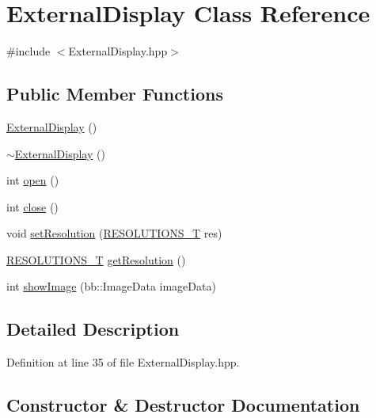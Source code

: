 \hypertarget{class_external_display}{}\section{External\+Display Class Reference}
\label{class_external_display}


{\ttfamily \#include $<$External\+Display.\+hpp$>$}

\subsection*{Public Member Functions}
\begin{DoxyCompactItemize}
\item 
\hyperlink{class_external_display_acb2cebd56141046228bfb6c653fb1e46}{External\+Display} ()
\item 
\hyperlink{class_external_display_a0ef112afc9408ac2a787dd5d8b74127b}{$\sim$\+External\+Display} ()
\item 
int \hyperlink{class_external_display_aaf0cfeaf1464cf09bb931b71b0695cfc}{open} ()
\item 
int \hyperlink{class_external_display_a63bded082f1005f82540741c47fc40ef}{close} ()
\item 
void \hyperlink{class_external_display_af999fd20458b4f474b3c8009af0820ce}{set\+Resolution} (\hyperlink{_external_display_8hpp_aec53cff8866c55706875f08a5cb6aa6a}{R\+E\+S\+O\+L\+U\+T\+I\+O\+N\+S\+\_\+\+T} res)
\item 
\hyperlink{_external_display_8hpp_aec53cff8866c55706875f08a5cb6aa6a}{R\+E\+S\+O\+L\+U\+T\+I\+O\+N\+S\+\_\+\+T} \hyperlink{class_external_display_ad3d322bcd2e6fec7d6855afdff327a53}{get\+Resolution} ()
\item 
int \hyperlink{class_external_display_a7976e7176c0d28787f85ee69d5ef5258}{show\+Image} (bb\+::\+Image\+Data image\+Data)
\end{DoxyCompactItemize}


\subsection{Detailed Description}


Definition at line 35 of file External\+Display.\+hpp.



\subsection{Constructor \& Destructor Documentation}
\hypertarget{class_external_display_acb2cebd56141046228bfb6c653fb1e46}{}
